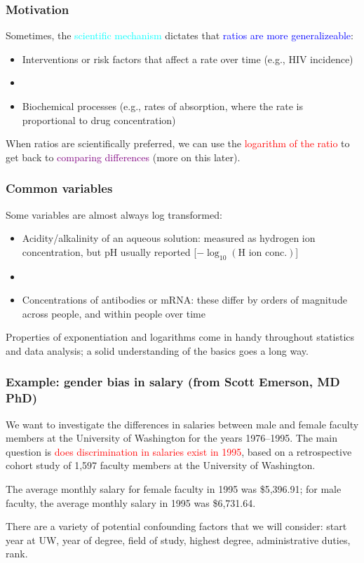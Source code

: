 \documentclass[11pt]{beamer}
\newcommand{\myframe}[1]{\begin{frame} \frametitle{#1}}
\begin{document}
\myframe{Motivation}
Sometimes, the \textcolor{cyan}{scientific mechanism} dictates that \textcolor{blue}{ratios are more generalizeable}: \pause
{\fontsize{10pt}{7.2}\selectfont
\begin{itemize}
\item Interventions or risk factors that affect a rate over time (e.g., HIV incidence)
\item[] \pause
\item Biochemical processes (e.g., rates of absorption, where the rate is proportional to drug concentration) 
\end{itemize}
}
\pause
When ratios are scientifically preferred, we can use the \textcolor{red}{logarithm of the ratio} to get back to \textcolor{purple}{comparing differences} (more on this later).
\end{frame}

\myframe{Common variables}
Some variables are almost always log transformed: \pause
\begin{itemize}
\item Acidity/alkalinity of an aqueous solution: measured as hydrogen ion concentration, but pH usually reported [$-\log_{10}(\text{H ion conc.})$]
\item[] \pause
\item Concentrations of antibodies or mRNA: these differ by orders of magnitude across people, and within people over time
\end{itemize}
\pause
Properties of exponentiation and logarithms come in handy throughout statistics and data analysis; a solid understanding of the basics goes a long way.
\end{frame}

\myframe{Example: gender bias in salary {\small (from Scott Emerson, MD PhD)}}
We want to investigate the differences in salaries between male and female faculty members at the University of Washington for the years 1976--1995. The main question is \textcolor{red}{does discrimination in salaries exist in 1995}, based on a retrospective cohort study of 1,597 faculty members at the University of Washington. \pause

The average monthly salary for female faculty in 1995 was \$5,396.91; for male faculty, the average monthly salary in 1995 was \$6,731.64. \pause

There are a variety of potential confounding factors that we will consider: start year at UW, year of degree, field of study, highest degree, administrative duties, rank.
\end{frame}
\end{document}
